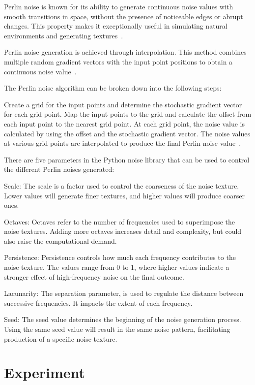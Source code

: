 \documentclass[runningheads,a4paper]{llncs}
\begin{document}
Perlin noise is known for its ability to generate continuous noise values with smooth transitions in space, without the presence of noticeable edges or abrupt changes. This property makes it exceptionally useful in simulating natural environments and generating textures~\cite{perlin1985image}.

Perlin noise generation is achieved through interpolation. This method combines multiple random gradient vectors with the input point positions to obtain a continuous noise value~\cite{green2005implementing}. 

The Perlin noise algorithm can be broken down into the following steps:

Create a grid for the input points and determine the stochastic gradient vector for each grid point.
Map the input points to the grid and calculate the offset from each input point to the nearest grid point.
At each grid point, the noise value is calculated by using the offset and the stochastic gradient vector.
The noise values at various grid points are interpolated to produce the final Perlin noise value~\cite{green2005implementing}.

There are five parameters in the Python noise library that can be used to control the different Perlin noises generated:

Scale: The scale is a factor used to control the coarseness of the noise texture. Lower values will generate finer textures, and higher values will produce coarser ones.

Octaves: Octaves refer to the number of frequencies used to superimpose the noise textures. Adding more octaves increases detail and complexity, but could also raise the computational demand.

Persistence: Persistence controls how much each frequency contributes to the noise texture. The values range from 0 to 1, where higher values indicate a stronger effect of high-frequency noise on the final outcome.

Lacunarity: The separation parameter, is used to regulate the distance between successive frequencies. It impacts the extent of each frequency.

Seed: The seed value determines the beginning of the noise generation process. Using the same seed value will result in the same noise pattern, facilitating production of a specific noise texture.


\section{Experiment}
\end{document}
